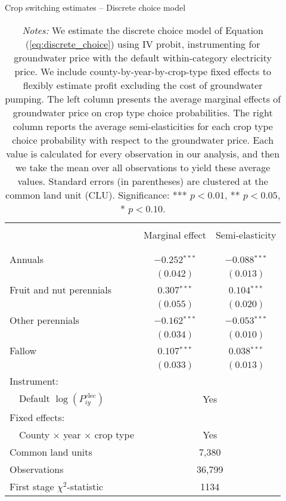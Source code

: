 \begin{table}[t!]\centering
\small
\caption{Crop switching estimates -- Discrete choice model \label{tab:probit_results}}
\vspace{-0.1cm}
\small
\begin{adjustbox}{center} 
\begin{tabular}{lcc} 
\hline \hline
\vspace{-0.37cm}
\\
 & Marginal effect & Semi-elasticity \\
\vspace{-0.37cm}
\\
\cline{2-3}
\vspace{-0.27cm}
\\
Annuals & $-0.252$$^{***}$ & $-0.088$$^{***}$ \\ 
& $(0.042)$ & $(0.013)$ \\ 
[0.1em]
Fruit and nut perennials & $0.307$$^{***}$ & $0.104$$^{***}$ \\ 
& $(0.055)$ & $(0.020)$ \\ 
[0.1em]
Other perennials & $-0.162$$^{***}$ & $-0.053$$^{***}$ \\ 
& $(0.034)$ & $(0.010)$ \\ 
[0.1em]
Fallow & $0.107$$^{***}$ & $0.038$$^{***}$ \\ 
& $(0.033)$ & $(0.013)$ \\ 
[1.5em]
Instrument: \\ 
[0.1em] 
~~Default $\log(P^{\text{elec}}_{iy})$ & \multicolumn{2}{c}{Yes} \\ 
Fixed effects: \\ 
[0.1em] 
~~County $\times$ year $\times$ crop type & \multicolumn{2}{c}{Yes} \\ 
[1.5em] 
Common land units & \multicolumn{2}{c}{7,380} \\ 
[0.1em] 
Observations & \multicolumn{2}{c}{36,799} \\ 
[0.1em] 
First stage $\chi^2$-statistic & \multicolumn{2}{c}{1134} \\ 
[0.15em]
\hline
\end{tabular}
\end{adjustbox}
\captionsetup{width=\textwidth}
\caption*{\scriptsize \emph{Notes:} We estimate the discrete choice model of Equation (\ref{eq:discrete_choice}) using IV probit, instrumenting for groundwater price with the default within-category electricity price. 
We include county-by-year-by-crop-type fixed effects to flexibly estimate profit excluding the cost of groundwater pumping.
The left column presents the average marginal effects of groundwater price on crop type choice probabilities.
The right column reports the average semi-elasticities for each crop type choice probability with respect to the groundwater price.
Each value is calculated for every observation in our analysis, and then we take the mean over all observations to yield these average values. 
Standard errors (in parentheses) are clustered at the common land unit (CLU).
Significance: *** $p < 0.01$, ** $p < 0.05$, * $p < 0.10$.
}
\end{table}
